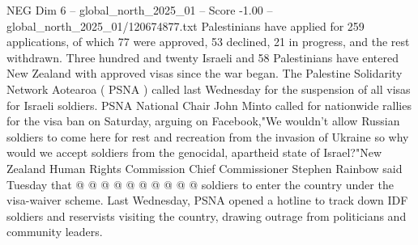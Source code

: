 \begin{textsample}{NEG Dim 6 – global\_north\_2025\_01 – Score -1.00 – global\_north\_2025\_01/120674877.txt}
Palestinians have applied for 259 applications, of which 77 were approved, 53 declined, 21 in progress, and the rest withdrawn.
Three hundred and twenty Israeli and 58 Palestinians have entered New Zealand with approved visas since the war began.
The Palestine Solidarity Network Aotearoa ( PSNA ) called last Wednesday for the suspension of all visas for Israeli soldiers.
PSNA National Chair John Minto called for nationwide rallies for the visa ban on Saturday, arguing on Facebook,"We wouldn't allow Russian soldiers to come here for rest and recreation from the invasion of Ukraine so why would we accept soldiers from the genocidal, apartheid state of Israel?"New Zealand Human Rights Commission Chief Commissioner Stephen Rainbow said Tuesday that @ @ @ @ @ @ @ @ @ @ soldiers to enter the country under the visa-waiver scheme.
Last Wednesday, PSNA opened a hotline to track down IDF soldiers and reservists visiting the country, drawing outrage from politicians and community leaders.

\end{textsample}
